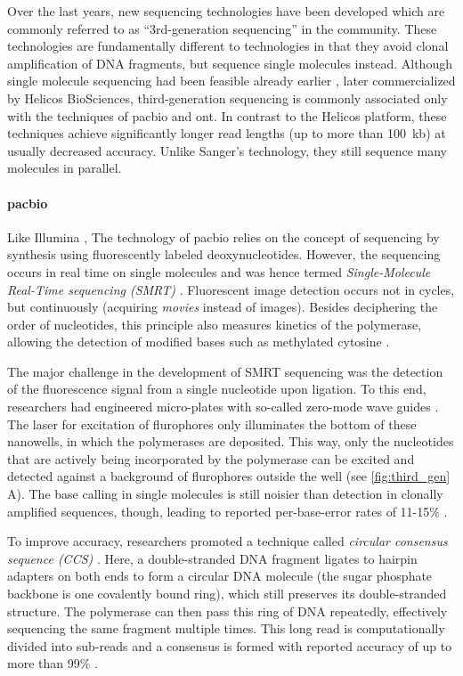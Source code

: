 Over the last years, new sequencing technologies have been developed which are
commonly referred to as ``3rd-generation sequencing'' in the community. These
technologies are fundamentally different to \mps technologies in that they avoid
clonal amplification of DNA fragments, but sequence single molecules instead.
Although single molecule sequencing had been feasible already earlier
\citep{Braslavsky2003}, later commercialized by Helicos BioSciences,
third-generation sequencing is commonly associated only with the techniques of
\acf{pacbio} and \acf{ont}. In contrast to the Helicos platform, these
techniques achieve significantly longer read lengths (up to more than 100~kb)
at usually decreased accuracy. Unlike Sanger's technology, they still sequence
many molecules in parallel.

\paragraph{\acl{pacbio}}
Like Illumina \mps, The technology of \acl{pacbio} relies on the concept of sequencing by synthesis using
fluorescently labeled deoxynucleotides. However, the sequencing
occurs in real time on single molecules and was hence termed
\emph{Single-Molecule Real-Time sequencing (SMRT)} \citep{Eid2009}. Fluorescent
image detection occurs not in cycles, but continuously (acquiring \emph{movies} instead of images).
Besides deciphering the order of nucleotides, this principle also measures
kinetics of the polymerase, allowing the detection of modified bases such as
methylated cytosine \citep{Flusberg2010}.

The major challenge in the development of SMRT sequencing
was the detection of the fluorescence signal from a single nucleotide upon
ligation. To this end, researchers had engineered micro-plates with so-called
zero-mode wave guides \citep{Uemura2010}. The laser for excitation of
flurophores only illuminates the bottom of these nanowells, in which the
polymerases are deposited. This way, only the nucleotides that are actively
being incorporated by the polymerase can be excited and detected
against a background of flurophores outside the well \citep{Heather2016} (see
\cref{fig:third_gen} A). The base calling in single molecules is still noisier than
detection in clonally amplified sequences, though, leading to reported per-base-error
rates of 11-15\% \citep{Rhoads2015}.

To improve accuracy, \pacbio researchers
promoted a technique called \emph{circular consensus sequence (CCS)}
\citep{Travers2010}. Here, a double-stranded DNA fragment ligates to hairpin
adapters on both ends to form a circular DNA molecule (the sugar phosphate
backbone is one covalently bound ring), which still preserves
its double-stranded structure. The polymerase can then pass this ring of DNA
repeatedly, effectively sequencing the same fragment multiple times. This long
read is computationally divided into sub-reads and a consensus is formed with
reported accuracy of up to more than 99\% \citep{Rhoads2015}.

